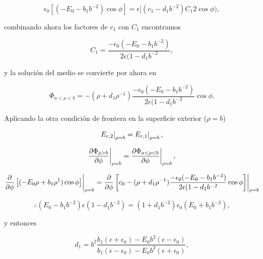 \documentclass[a4paper,11pt]{article}
\numberwithin{equation}{section}
\newcommand{\zerodel}{.\kern-\nulldelimiterspace}
\begin{document}
\begin{equation}
 \epsilon_0\left[(-E_0 - b_1b^{-2})\cos{\phi}\right] = 
 \epsilon [(c_1 - d_1 b^{-2})C_1 2\cos{\phi}),
\end{equation}

combinando ahora los factores de $c_1$ con $C_1$ encontramos 

\begin{equation}
 C_1 = \frac{-\epsilon_0(-E_0 - b_1b^{-2})}{2\epsilon(1 - d_1b^{-2}},
\end{equation}

y la solución del medio se convierte por ahora en 

\begin{equation}
 \Phi_{a < \rho < b} = -(\rho + d_1 \rho^{-1})
 \frac{-\epsilon_0(-E_0 - b_1b^{-2})}{2\epsilon(1 - d_1b^{-2}}\cos{\phi}.
\end{equation}

Aplicando la otra condición de frontera en la superficie exterior ($\rho = b$) 

\begin{equation}
 \left\zerodel E_{r,2}\right|_{\rho=b} = \left\zerodel E_{r,1}\right|_{\rho=b},
\end{equation}

\begin{equation*}
 \left\zerodel\frac{\partial \Phi_{\rho>b}}{\partial \phi}\right|_{\rho=b} = 
 \left\zerodel\frac{\partial \Phi_{a < \rho < b}}{\partial \phi}\right|_{\rho=b},
\end{equation*}

\begin{equation*}
 \left\zerodel\frac{\partial}{\partial \phi}\left[(-E_0 \rho + b_1 \rho^{1})\cos{\phi} \right]\right|_{\rho=b} = 
\left\zerodel \frac{\partial}{\partial \phi}\left[c_0  -(\rho + d_1 \rho^{-1})
 \frac{-\epsilon_0(-E_0 - b_1b^{-2})}{2\epsilon(1 - d_1b^{-2}}\cos{\phi}\right]\right|_{\rho=b}
\end{equation*}

\begin{equation}
 \therefore (E_0 - b_1b^{-2})\epsilon(1 - d_1 b^{-2}) = (1 + d_1b^{-2})\epsilon_0 
 (E_0+ b_1b^{-2}),
\end{equation}

y entonces 

\begin{equation}
 d_1 = b^2 \frac{b_1(\epsilon + \epsilon_0) - E_0b^2(\epsilon - \epsilon_0)}
 {b_1(\epsilon - \epsilon_0) - E_0b^2(\epsilon + \epsilon_0)},
\end{equation}
\end{document}
